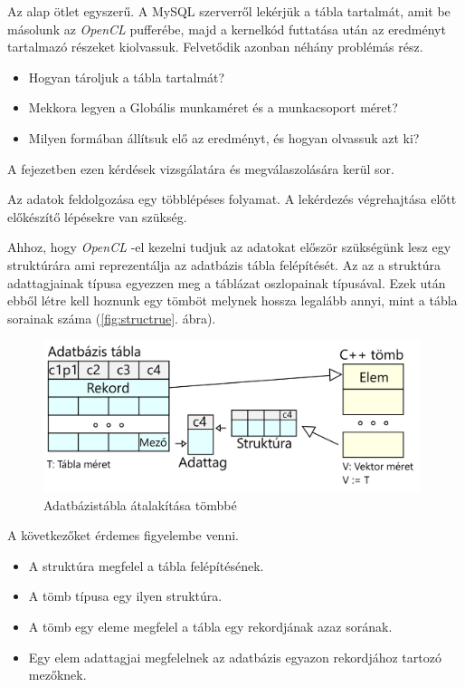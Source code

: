 
Az alap ötlet egyszerű. A MySQL szerverről lekérjük a tábla tartalmát, amit be másolunk az \textit{OpenCL} pufferébe, majd a kernelkód futtatása után az eredményt tartalmazó részeket kiolvassuk. Felvetődik azonban néhány problémás rész.
\begin{itemize}
	\item Hogyan tároljuk a tábla tartalmát?
	\item Mekkora legyen a Globális munkaméret és a munkacsoport méret?
	\item Milyen formában állítsuk elő az eredményt, és hogyan olvassuk azt ki?
\end{itemize}
A fejezetben ezen kérdések vizsgálatára és megválaszolására kerül sor.


Az adatok feldolgozása egy többlépéses folyamat. A lekérdezés végrehajtása előtt előkészítő lépésekre van szükség.


Ahhoz, hogy \textit{OpenCL} -el kezelni tudjuk az adatokat először szükségünk lesz egy struktúrára ami reprezentálja az adatbázis tábla felépítését. Az az a struktúra adattagjainak típusa egyezzen meg a táblázat oszlopainak típusával. Ezek után ebből létre kell hoznunk egy tömböt melynek hossza legalább annyi, mint a tábla sorainak száma (\ref{fig:structrue}. ábra).

\begin{figure}[h!]
\centering
\includegraphics[width=11cm]{images/data/structure.png}
\caption{Adatbázistábla átalakítása tömbbé}
\label{fig:structure}
\end{figure}

A következőket érdemes figyelembe venni.
\begin{itemize}
\item A struktúra megfelel a tábla felépítésének.
\item A tömb típusa egy ilyen struktúra.
\item A tömb egy eleme megfelel a tábla egy rekordjának azaz sorának.
\item Egy elem adattagjai megfelelnek az adatbázis egyazon rekordjához tartozó mezőknek.
\end{itemize}

